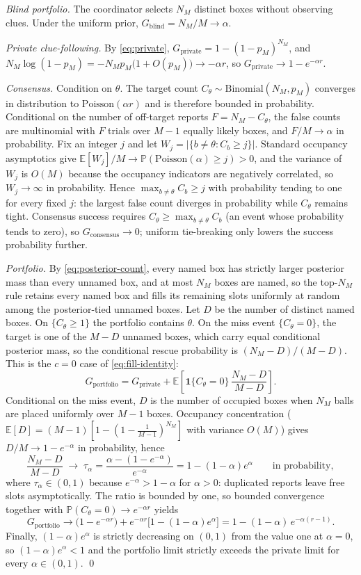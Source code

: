 \documentclass[11pt]{article}
\theoremstyle{definition}
\theoremstyle{remark}
\newcommand{\E}{\mathbb{E}}
\newcommand{\Prob}{\mathbb{P}}
\newcommand{\1}{\mathbf{1}}
\newcommand{\priv}{\mathrm{private}}
\newcommand{\cons}{\mathrm{consensus}}
\begin{document}
\emph{Blind portfolio.} The coordinator selects $N_M$ distinct boxes without observing clues. Under the uniform prior, $G_{\mathrm{blind}}=N_M/M\to\alpha$.

\emph{Private clue-following.} By \cref{eq:private}, $G_{\priv}=1-(1-p_M)^{N_M}$, and $N_M\log(1-p_M)=-N_Mp_M\bigl(1+O(p_M)\bigr)\to-\alpha r$, so $G_{\priv}\to1-e^{-\alpha r}$.

\emph{Consensus.} Condition on $\theta$. The target count $C_\theta\sim\mathrm{Binomial}(N_M,p_M)$ converges in distribution to $\mathrm{Poisson}(\alpha r)$ and is therefore bounded in probability. Conditional on the number of off-target reports $F=N_M-C_\theta$, the false counts are multinomial with $F$ trials over $M-1$ equally likely boxes, and $F/M\to\alpha$ in probability. Fix an integer $j$ and let $W_j=|\{b\neq\theta:C_b\ge j\}|$. Standard occupancy asymptotics give $\E[W_j]/M\to\Prob(\mathrm{Poisson}(\alpha)\ge j)>0$, and the variance of $W_j$ is $O(M)$ because the occupancy indicators are negatively correlated, so $W_j\to\infty$ in probability. Hence $\max_{b\neq\theta}C_b\ge j$ with probability tending to one for every fixed $j$: the largest false count diverges in probability while $C_\theta$ remains tight. Consensus success requires $C_\theta\ge\max_{b\neq\theta}C_b$ (an event whose probability tends to zero), so $G_{\cons}\to0$; uniform tie-breaking only lowers the success probability further.

\emph{Portfolio.} By \cref{eq:posterior-count}, every named box has strictly larger posterior mass than every unnamed box, and at most $N_M$ boxes are named, so the top-$N_M$ rule retains every named box and fills its remaining slots uniformly at random among the posterior-tied unnamed boxes. Let $D$ be the number of distinct named boxes. On $\{C_\theta\ge1\}$ the portfolio contains $\theta$. On the miss event $\{C_\theta=0\}$, the target is one of the $M-D$ unnamed boxes, which carry equal conditional posterior mass, so the conditional rescue probability is $(N_M-D)/(M-D)$. This is the $c=0$ case of \cref{eq:fill-identity}:
\[
G_{\mathrm{portfolio}}
=G_{\priv}+\E\!\left[\1\{C_\theta=0\}\,\frac{N_M-D}{M-D}\right].
\]
Conditional on the miss event, $D$ is the number of occupied boxes when $N_M$ balls are placed uniformly over $M-1$ boxes. Occupancy concentration ($\E[D]=(M-1)[1-(1-\tfrac{1}{M-1})^{N_M}]$ with variance $O(M)$) gives $D/M\to1-e^{-\alpha}$ in probability, hence
\[
\frac{N_M-D}{M-D}
\;\longrightarrow\;
\tau_\alpha
=\frac{\alpha-(1-e^{-\alpha})}{e^{-\alpha}}
=1-(1-\alpha)e^{\alpha}
\qquad\text{in probability},
\]
where $\tau_\alpha\in(0,1)$ because $e^{-\alpha}>1-\alpha$ for $\alpha>0$: duplicated reports leave free slots asymptotically. The ratio is bounded by one, so bounded convergence together with $\Prob(C_\theta=0)\to e^{-\alpha r}$ yields
\[
G_{\mathrm{portfolio}}
\longrightarrow
\bigl(1-e^{-\alpha r}\bigr)+e^{-\alpha r}\bigl[1-(1-\alpha)e^{\alpha}\bigr]
=1-(1-\alpha)\,e^{-\alpha(r-1)}.
\]
Finally, $(1-\alpha)e^{\alpha}$ is strictly decreasing on $(0,1)$ from the value one at $\alpha=0$, so $(1-\alpha)e^{\alpha}<1$ and the portfolio limit strictly exceeds the private limit for every $\alpha\in(0,1)$. \qed
\end{document}
